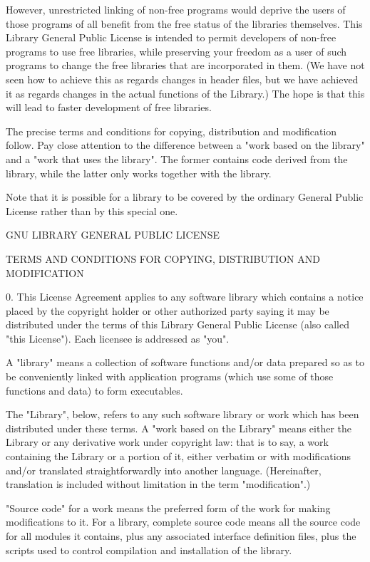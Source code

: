 \documentclass[a4paper,twoside]{tceusermanual}
\begin{document}
However, unrestricted linking of non-free programs would deprive
the users of those programs of all benefit from the free status
of the libraries themselves.  This Library General Public
License is intended to permit developers of non-free programs to
use free libraries, while preserving your freedom as a user of
such programs to change the free libraries that are incorporated
in them.  (We have not seen how to achieve this as regards
changes in header files, but we have achieved it as regards
changes in the actual functions of the Library.)  The hope is
that this will lead to faster development of free libraries.

The precise terms and conditions for copying, distribution and
modification follow.  Pay close attention to the difference
between a "work based on the library" and a "work that uses the
library".  The former contains code derived from the library,
while the latter only works together with the library.

Note that it is possible for a library to be covered by the
ordinary General Public License rather than by this special one.

\begin{center}
                GNU LIBRARY GENERAL PUBLIC LICENSE

 TERMS AND CONDITIONS FOR COPYING, DISTRIBUTION AND MODIFICATION
\end{center}

0. This License Agreement applies to any software library which
contains a notice placed by the copyright holder or other
authorized party saying it may be distributed under the terms of
this Library General Public License (also called "this
License").  Each licensee is addressed as "you".

A "library" means a collection of software functions and/or data
prepared so as to be conveniently linked with application
programs (which use some of those functions and data) to form
executables.

The "Library", below, refers to any such software library or
work which has been distributed under these terms.  A "work
based on the Library" means either the Library or any derivative
work under copyright law: that is to say, a work containing the
Library or a portion of it, either verbatim or with
modifications and/or translated straightforwardly into another
language.  (Hereinafter, translation is included without
limitation in the term "modification".)

"Source code" for a work means the preferred form of the work
for making modifications to it.  For a library, complete source
code means all the source code for all modules it contains, plus
any associated interface definition files, plus the scripts used
to control compilation and installation of the library.
\end{document}
